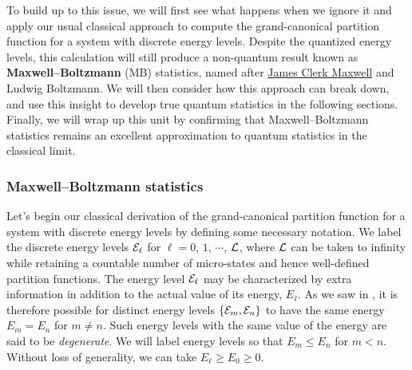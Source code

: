 To build up to this issue, we will first see what happens when we ignore it and apply our usual classical approach to compute the grand-canonical partition function for a system with discrete energy levels.
Despite the quantized energy levels, this calculation will still produce a non-quantum result known as \textbf{Maxwell--Boltzmann} (MB) statistics, named after \href{https://en.wikipedia.org/wiki/James_Clerk_Maxwell}{James Clerk Maxwell} and Ludwig Boltzmann.
We will then consider how this approach can break down, and use this insight to develop true quantum statistics in the following sections.
Finally, we will wrap up this unit by confirming that Maxwell--Boltzmann statistics remains an excellent approximation to quantum statistics in the classical limit.



\subsubsection{Maxwell--Boltzmann statistics}
Let's begin our classical derivation of the grand-canonical partition function for a system with discrete energy levels by defining some necessary notation.
We label the discrete energy levels $\mathcal E_{\ell}$ for $\ell = 0$, $1$, $\cdots$, $\mathcal L$, where $\mathcal L$ can be taken to infinity while retaining a countable number of micro-states and hence well-defined partition functions.
The energy level $\mathcal E_{\ell}$ may be characterized by extra information in addition to the actual value of its energy, $E_{\ell}$.
As we saw in , it is therefore possible for distinct energy levels $\left\{\mathcal E_m, \mathcal E_n\right\}$ to have the same energy $E_m = E_n$ for $m \neq n$. %
Such energy levels with the same value of the energy are said to be \textit{degenerate}.
We will label energy levels so that $E_m \leq E_n$ for $m < n$.
Without loss of generality, we can take $E_{\ell} \geq E_0 \geq 0$.


